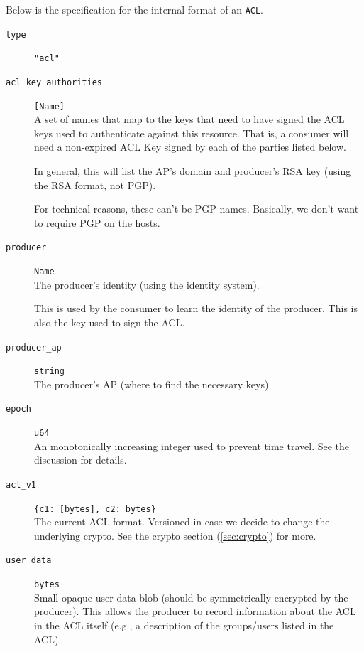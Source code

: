 \documentclass[pdftex,12pt,a4papaer,twoside,notitlepage]{report}
\begin{document}
Below is the specification for the internal format of an \texttt{ACL}.

\begin{leftbar}
\begin{description}
\item[\texttt{type}] \verb|"acl"|
\item[\texttt{acl\_key\_authorities}] \verb=[Name]= \\
  A set of names that map to the keys that need to have signed the ACL keys used
  to authenticate against this resource. That is, a consumer will need a
  non-expired ACL Key signed by each of the parties listed below.
  
  In general, this will list the AP's domain and producer's RSA key (using the
  RSA format, not PGP).
  
  For technical reasons, these can't be PGP names. Basically, we don't want to
  require PGP on the hosts.

\item[\texttt{producer}] \texttt{Name} \\
  The producer's identity (using the identity system).
  
  This is used by the consumer to learn the identity of the producer. This is
  also the key used to sign the ACL.

\item[\texttt{producer\_ap}] \texttt{string} \\
  The producer's AP (where to find the necessary keys).

\item[\texttt{epoch}] \texttt{u64} \\
  An monotonically increasing integer used to prevent
  time travel. See the discussion for details.

\item[\texttt{acl\_v1}] \verb={c1: [bytes], c2: bytes}= \\
  The current ACL format. Versioned in case we decide to change the underlying
  crypto. See the crypto section (\ref{sec:crypto}) for more.

\item[\texttt{user\_data}] \texttt{bytes} \\
  Small opaque user-data blob (should be symmetrically encrypted by the
  producer). This allows the producer to record information about the ACL in the
  ACL itself (e.g., a description of the groups/users listed in the ACL).
\end{description}
\end{leftbar}
\end{document}

